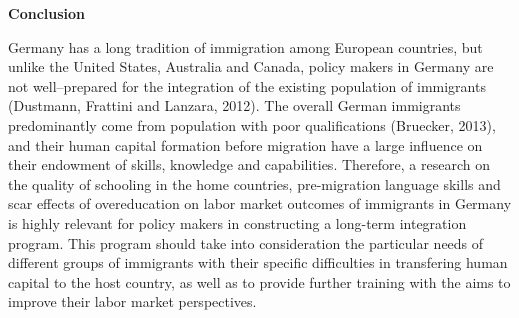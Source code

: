 \documentclass[a4paper, 11pt]{article} %
\begin{document}
\vspace{15pt}

\textbf{Conclusion}

\vspace{15pt}

Germany has a long tradition of immigration among European countries, but unlike the United States, Australia and Canada, policy makers in Germany are not well--prepared for the integration of the existing population of immigrants (Dustmann, Frattini and Lanzara, 2012). The overall German immigrants predominantly come from population with poor qualifications (Bruecker, 2013), and their human capital formation before migration have a large influence on their endowment of skills, knowledge and capabilities. Therefore, a research on the quality of schooling in the home countries, pre-migration language skills and scar effects of overeducation on labor market outcomes of immigrants in Germany is highly relevant for policy makers in constructing a long-term integration program. This program should take into consideration the particular needs of different groups of immigrants with their specific difficulties in transfering human capital to the host country, as well as to provide further training with the aims to improve their labor market perspectives.



\end{document}
